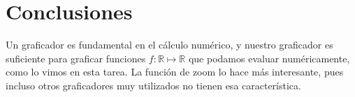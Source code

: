 \documentclass[10pt]{article}
\begin{document}
\section{Conclusiones}
Un graficador es fundamental en el cálculo numérico, y nuestro graficador es suficiente para graficar funciones $f:\mathbb{R}\mapsto\mathbb{R}$ que podamos evaluar numéricamente, como lo vimos en esta tarea. La función de zoom lo hace más interesante, pues incluso otros graficadores muy utilizados no tienen esa característica.


\end{document}
